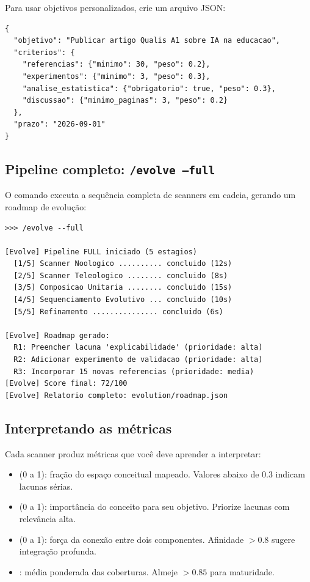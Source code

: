 Para usar objetivos personalizados, crie um arquivo JSON:

\begin{lstlisting}[style=pythonstyle, caption={Arquivo de objetivos para
scanner teleological --- \codigo{objetivos.json}},
label={lst:goals-file}]
{
  "objetivo": "Publicar artigo Qualis A1 sobre IA na educacao",
  "criterios": {
    "referencias": {"minimo": 30, "peso": 0.2},
    "experimentos": {"minimo": 3, "peso": 0.3},
    "analise_estatistica": {"obrigatorio": true, "peso": 0.3},
    "discussao": {"minimo_paginas": 3, "peso": 0.2}
  },
  "prazo": "2026-09-01"
}
\end{lstlisting}

\subsection{Pipeline completo: \texttt{/evolve --full}}
\label{subsec:evolve-full}

O comando  executa a sequência completa de
scanners em cadeia, gerando um roadmap de evolução:

\begin{lstlisting}[style=bashstyle, caption={Pipeline evolutivo completo},
label={lst:evolve-full}]
>>> /evolve --full

[Evolve] Pipeline FULL iniciado (5 estagios)
  [1/5] Scanner Noologico .......... concluido (12s)
  [2/5] Scanner Teleologico ........ concluido (8s)
  [3/5] Composicao Unitaria ........ concluido (15s)
  [4/5] Sequenciamento Evolutivo ... concluido (10s)
  [5/5] Refinamento ............... concluido (6s)

[Evolve] Roadmap gerado:
  R1: Preencher lacuna 'explicabilidade' (prioridade: alta)
  R2: Adicionar experimento de validacao (prioridade: alta)
  R3: Incorporar 15 novas referencias (prioridade: media)
[Evolve] Score final: 72/100
[Evolve] Relatorio completo: evolution/roadmap.json
\end{lstlisting}

\subsection{Interpretando as métricas}
\label{subsec:metricas}

Cada scanner produz métricas que você deve aprender a interpretar:

\begin{itemize}
\item {} (0 a 1): fração do espaço conceitual mapeado.
      Valores abaixo de 0.3 indicam lacunas sérias.
\item {} (0 a 1): importância do conceito para seu
      objetivo. Priorize lacunas com relevância alta.
\item {} (0 a 1): força da conexão entre dois
      componentes. Afinidade $> 0.8$ sugere integração profunda.
\item {}: média ponderada das coberturas.
      Almeje $> 0.85$ para maturidade.
\end{itemize}

